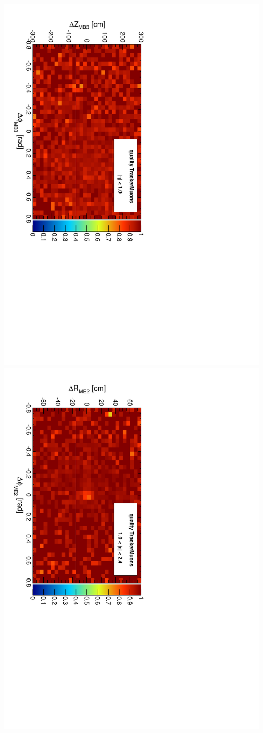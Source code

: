 \documentclass[compress]{beamer}
\begin{document}
\begin{frame}
\includegraphics[height=0.49\linewidth, angle=90]{mb3_PlainTrackerMuon.pdf}
\includegraphics[height=0.49\linewidth, angle=90]{me2_PlainTrackerMuon.pdf}
\end{frame}



\end{document}
